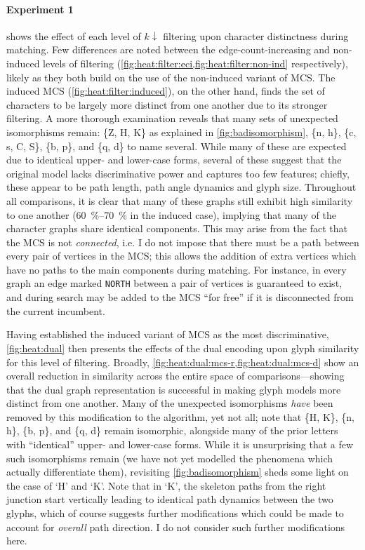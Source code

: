 \documentclass{mpaper}
\begin{document}
\paragraph{Experiment 1}
 shows the effect of each level of $k\downarrow$ filtering upon character distinctness during matching.
Few differences are noted between the edge-count-increasing and non-induced levels of filtering (\cref{fig:heat:filter:eci,fig:heat:filter:non-ind} respectively), likely as they both build on the use of the non-induced variant of MCS.
The induced MCS (\cref{fig:heat:filter:induced}), on the other hand, finds the set of characters to be largely more distinct from one another due to its stronger filtering.
A more thorough examination reveals that many sets of unexpected isomorphisms remain: \{Z, H, K\} as explained in \cref{fig:badisomorphism}, \{n, h\}, \{c, s, C, S\}, \{b, p\}, and \{q, d\} to name several.
While many of these are expected due to identical upper- and lower-case forms, several of these suggest that the original model lacks discriminative power and captures too few features; chiefly, these appear to be path length, path angle dynamics and glyph size.
Throughout all comparisons, it is clear that many of these graphs still exhibit high similarity to one another (\SIrange{60}{70}{\percent} in the induced case), implying that many of the character graphs share identical components.
This may arise from the fact that the MCS is not \emph{connected}, i.e. I do not impose that there must be a path between every pair of vertices in the MCS; this allows the addition of extra vertices which have no paths to the main components during matching.
For instance, in every graph an edge marked \texttt{NORTH} between a pair of vertices is guaranteed to exist, and during search may be added to the MCS ``for free'' if it is disconnected from the current incumbent.

Having established the induced variant of MCS as the most discriminative, \cref{fig:heat:dual} then presents the effects of the dual encoding upon glyph similarity for this level of filtering.
Broadly, \cref{fig:heat:dual:mcs-r,fig:heat:dual:mcs-d} show an overall reduction in similarity across the entire space of comparisons---showing that the dual graph representation is successful in making glyph models more distinct from one another.
Many of the unexpected isomorphisms \emph{have} been removed by this modification to the algorithm, yet not all; note that \{H, K\}, \{n, h\}, \{b, p\}, and \{q, d\} remain isomorphic, alongside many of the prior letters with ``identical'' upper- and lower-case forms.
While it is unsurprising that a few such isomorphisms remain (we have not yet modelled the phenomena which actually differentiate them), revisiting \cref{fig:badisomorphism} sheds some light on the case of `H' and `K'.
Note that in `K', the skeleton paths from the right junction start vertically leading to identical path dynamics between the two glyphs, which of course suggests further modifications which could be made to account for \emph{overall} path direction.
I do not consider such further modifications here.
\end{document}
